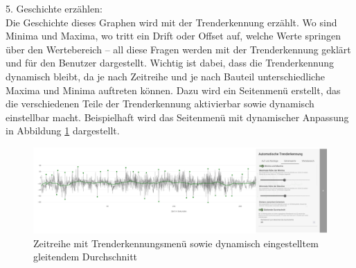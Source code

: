 5. Geschichte erzählen:\\
Die Geschichte dieses Graphen wird mit der Trenderkennung erzählt. Wo sind Minima und Maxima, wo tritt ein Drift oder Offset auf, welche Werte springen über den Wertebereich -- all diese Fragen werden mit der Trenderkennung geklärt und für den Benutzer dargestellt. Wichtig ist dabei, dass die Trenderkennung dynamisch bleibt, da je nach Zeitreihe und je nach Bauteil unterschiedliche Maxima und Minima auftreten können. Dazu wird ein Seitenmenü erstellt, das die verschiedenen Teile der Trenderkennung aktivierbar sowie dynamisch einstellbar macht. Beispielhaft wird das Seitenmenü mit dynamischer Anpassung in Abbildung  \ref{fig:zeitreihe_mit_trenderkennung} dargestellt.
\begin{figure}[h!]
    \centering
    \includegraphics[width=\linewidth]{gfx/zeitreihe_mit_trenderkennung.png}
    \caption{Zeitreihe mit Trenderkennungsmenü sowie dynamisch eingestelltem gleitendem Durchschnitt}
    \label{fig:zeitreihe_mit_trenderkennung}
\end{figure}

